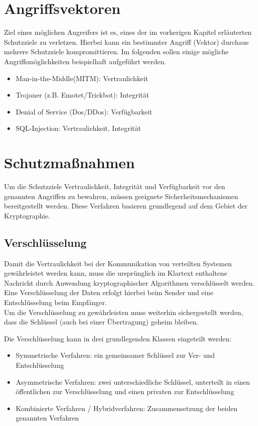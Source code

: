 \documentclass[12pt,a4paper,parskip=half]{scrreprt}
\begin{document}
\section{Angriffsvektoren}

Ziel eines möglichen Angreifers ist es, eines der im vorherigen Kapitel erläuterten Schutzziele zu verletzen. Hierbei kann ein bestimmter Angriff (Vektor) durchaus mehrere Schutzziele kompromittieren. Im folgenden sollen einige mögliche Angriffsmöglichkeiten beispielhaft aufgeführt werden.

\begin{itemize}
	\item Man-in-the-Middle(MITM): Vertraulichkeit
	\item Trojaner (z.B. Emotet/Trickbot): Integrität
	\item Denial of Service (Dos/DDos): Verfügbarkeit
	\item SQL-Injection: Vertraulichkeit, Integrität
\end{itemize}

\section{Schutzmaßnahmen}

Um die Schutzziele Vertraulichkeit, Integrität und Verfügbarkeit vor den genannten Angriffen zu bewahren, müssen geeignete Sicherheitsmechanismen bereitgestellt werden. Diese Verfahren basieren grundlegend auf dem Gebiet der Kryptographie.

\subsection{Verschlüsselung}

Damit die Vertraulichkeit bei der Kommunikation von verteilten Systemen gewährleistet werden kann, muss die ursprünglich im Klartext enthaltene Nachricht durch Anwendung kryptographischer Algorithmen verschlüsselt werden. Eine Verschlüsselung der Daten erfolgt hierbei beim Sender und eine Entschlüsselung beim Empfänger. \\
Um die Verschlüsselung zu gewährleisten muss weiterhin sichergestellt werden, dass die Schlüssel (auch bei einer Übertragung) geheim bleiben.

Die Verschlüsselung kann in drei grundlegenden Klassen eingeteilt werden:
\begin{itemize}
	\item Symmetrische Verfahren: ein gemeinsamer Schlüssel zur Ver- und Entschlüsselung
	\item Asymmetrische Verfahren: zwei unterschiedliche Schlüssel, unterteilt in einen öffentlichen zur Verschlüsselung und einen privaten zur Entschlüsselung
	\item Kombinierte Verfahren / Hybridverfahren: Zusammensetzung der beiden genannten Verfahren
\end{itemize}
\end{document}
